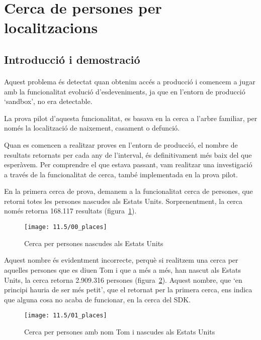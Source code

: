 \section{Cerca de persones per localitzacions}

\subsection{Introducció i demostració}

\paragraph{}
Aquest problema és detectat quan obtenim accés a producció i comencem a jugar amb la funcionalitat evolució d'esdeveniments, ja que en l'entorn de producció `sandbox', no era detectable.

La prova pilot d'aquesta funcionalitat, es basava en la cerca a l'arbre familiar, per només la localització de naixement, casament o defunció.

Quan es comencen a realitzar proves en l'entorn de producció, el nombre de resultats retornats per cada any de l'interval, és definitivament més baix del que esperàvem. Per comprendre el que estava passant, vam realitzar una investigació a través de la funcionalitat de cerca, també implementada en la prova pilot.

En la primera cerca de prova, demanem a la funcionalitat cerca de persones, que retorni totes les persones nascudes als Estats Units. Sorprenentment, la cerca només retorna 168.117 resultats (figura~\ref{fig:searchStates}).

\begin{figure}[h]
    \texttt{[image: 11.5/00\_places]}
    \centering
    \caption{Cerca per persones nascudes als Estats Units}\label{fig:searchStates}
\end{figure}

Aquest nombre és evidentment incorrecte, perquè si realitzem una cerca per aquelles persones que es diuen Tom i que a més a més, han nascut als Estats Units, la cerca retorna 2.909.316 persones (figura~\ref{fig:searchTom}). Aquest nombre, que `en principi hauria de ser més petit', que el retornat per la primera cerca, ens indica que alguna cosa no acaba de funcionar, en la cerca del SDK.

\begin{figure}[h]
    \texttt{[image: 11.5/01\_places]}
    \centering
    \caption{Cerca per persones amb nom Tom i nascudes als Estats Units}\label{fig:searchTom}
\end{figure}


